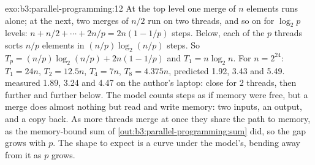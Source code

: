 \begin{solution}{exo:b3:parallel-programming:12}
At the top level one merge of $n$ elements runs alone; at the next, two merges of $n/2$ run on two threads, and so on for $\log_2 p$ levels: $n + n/2 + \cdots + 2n/p = 2n(1 - 1/p)$ steps. Below, each of the $p$ threads sorts $n/p$ elements in $(n/p)\log_2(n/p)$ steps. So $T_p = (n/p)\log_2(n/p) + 2n(1 - 1/p)$ and $T_1 = n\log_2 n$. For $n = 2^{24}$: $T_1 = 24n$, $T_2 = 12.5n$, $T_4 = 7n$, $T_8 = 4.375n$, predicted  1.92, 3.43 and 5.49.  measured 1.89, 3.24 and 4.47 on the author's laptop: close for 2 threads, then further and further below. The model counts steps as if memory were free, but a merge does almost nothing but read and write memory: two inputs, an output, and a copy back. As more threads merge at once they share the path to memory, as the memory-bound sum of \cref{out:b3:parallel-programming:sum} did, so the gap grows with $p$. The shape to expect is a curve under the model's, bending away from it as $p$ grows.
\end{solution}

